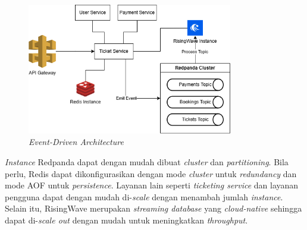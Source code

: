 \begin{figure}[ht]
  \centering
  \includegraphics[width=0.8\textwidth]{resources/chapter-3/architecture-event-driven.png}
  \caption{\textit{Event-Driven Architecture}}
  \label{fig:solution-event-driven-architecture}
\end{figure}

\textit{Instance} Redpanda dapat dengan mudah dibuat \textit{cluster} dan \textit{partitioning}. Bila perlu, Redis dapat dikonfigurasikan dengan mode \textit{cluster} untuk \textit{redundancy} dan mode AOF untuk \textit{persistence}. Layanan lain seperti \textit{ticketing service} dan layanan pengguna dapat dengan mudah di-\textit{scale} dengan menambah jumlah \textit{instance}. Selain itu, RisingWave merupakan \textit{streaming database} yang \textit{cloud-native} sehingga dapat di-\textit{scale out} dengan mudah untuk meningkatkan \textit{throughput}.


